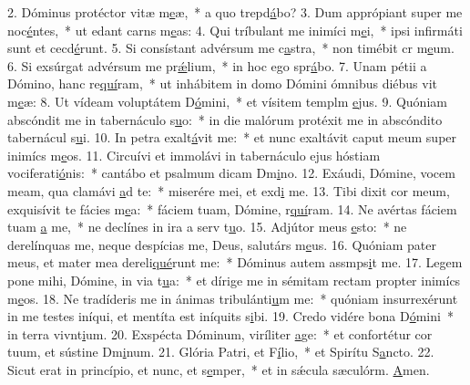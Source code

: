 2. Dóminus protéctor vitæ m\uline{e}æ,~* a quo trepd\uline{á}bo?
3. Dum apprópiant super me noc\uline{é}ntes,~* ut edant carns m\uline{e}as:
4. Qui tríbulant me inimíci m\uline{e}i,~* ipsi infirmáti sunt et cecd\uline{é}runt.
5. Si consístant advérsum me c\uline{a}stra,~* non timébit cr m\uline{e}um.
6. Si exsúrgat advérsum me pr\uline{ǽ}lium,~* in hoc ego spr\uline{á}bo.
7. Unam pétii a Dómino, hanc re\uline{quí}ram,~* ut inhábitem in domo Dómini ómnibus diébus vit m\uline{e}æ:
8. Ut vídeam voluptátem D\uline{ó}mini,~* et vísitem templm \uline{e}jus.
9. Quóniam abscóndit me in tabernáculo s\uline{u}o:~* in die malórum protéxit me in abscóndito tabernácul s\uline{u}i.
10. In petra exalt\uline{á}vit me:~* et nunc exaltávit caput meum super inimícs m\uline{e}os.
11. Circuívi et immolávi in tabernáculo ejus hóstiam vociferati\uline{ó}nis:~* cantábo et psalmum dicam Dm\uline{i}no.
12. Exáudi, Dómine, vocem meam, qua clamávi \uline{a}d te:~* miserére mei, et exd\uline{i} me.
13. Tibi dixit cor meum, exquisívit te fácies m\uline{e}a:~* fáciem tuam, Dómine, r\uline{quí}ram.
14. Ne avértas fáciem tuam \uline{a} me,~* ne declínes in ira a serv t\uline{u}o.
15. Adjútor meus \uline{e}sto:~* ne derelínquas me, neque despícias me, Deus, salutárs m\uline{e}us.
16. Quóniam pater meus, et mater mea dereli\uline{qué}runt me:~* Dóminus autem assmps\uline{i}t me.
17. Legem pone mihi, Dómine, in via t\uline{u}a:~* et dírige me in sémitam rectam propter inimícs m\uline{e}os.
18. Ne tradíderis me in ánimas tribulánti\uline{u}m me:~* quóniam insurrexérunt in me testes iníqui, et mentíta est iníquits s\uline{i}bi.
19. Credo vidére bona D\uline{ó}mini~* in terra vivnt\uline{i}um.
20. Exspécta Dóminum, viríliter \uline{a}ge:~* et confortétur cor tuum, et sústine Dm\uline{i}num.
21. Glória Patri, et F\uline{í}lio,~* et Spirítu S\uline{a}ncto.
22. Sicut erat in princípio, et nunc, et s\uline{e}mper,~* et in sǽcula sæculórm. \uline{A}men.
